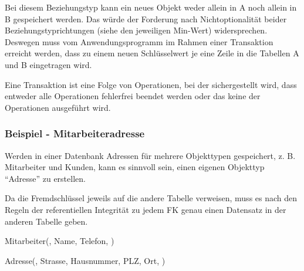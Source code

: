 
Bei diesem Beziehungstyp kann ein neues Objekt weder allein in A noch allein in B gespeichert werden. Das würde der Forderung nach Nichtoptionalität beider Beziehungstyprichtungen (siehe den jeweiligen Min-Wert) widersprechen. Deswegen muss vom Anwendungsprogramm im Rahmen einer Transaktion erreicht werden, dass zu einem neuen Schlüsselwert je eine Zeile in die Tabellen A und B eingetragen wird.

\begin{merke}
    Eine Transaktion ist eine Folge von Operationen, bei der sichergestellt wird, dass entweder alle Operationen fehlerfrei beendet werden oder das keine der Operationen ausgeführt wird.
\end{merke}
\subsubsection{Beispiel - Mitarbeiteradresse}
Werden in einer Datenbank Adressen für mehrere Objekttypen gespeichert, z. B. Mitarbeiter und Kunden, kann es sinnvoll sein, einen eigenen Objekttyp \enquote{Adresse} zu erstellen.

Da die Fremdschlüssel jeweils auf die andere Tabelle verweisen, muss es nach den Regeln der referentiellen Integrität zu jedem FK genau einen Datensatz in der anderen Tabelle geben.

\begin{center}
\end{center}
\begin{small}
    Mitarbeiter(, Name, Telefon, )

    Adresse(, Strasse, Hausnummer, PLZ, Ort, )
\end{small}
